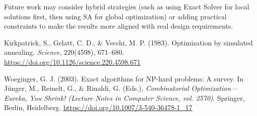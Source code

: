 \documentclass[conference]{IEEEtran}
\begin{document}
Future work may consider hybrid strategies (such as using Exact Solver for local solutions first, then using SA for global optimization) or adding practical constraints to make the results more aligned with real design requirements.

\FloatBarrier %

\begin{thebibliography}{99}
 Kirkpatrick, S., Gelatt, C. D., \& Vecchi, M. P. (1983). Optimization by simulated annealing. \textit{Science}, 220(4598), 671–680. \url{https://doi.org/10.1126/science.220.4598.671}

 Woeginger, G. J. (2003). Exact algorithms for NP-hard problems: A survey. In Jünger, M., Reinelt, G., \& Rinaldi, G. (Eds.), \textit{Combinatorial Optimization—Eureka, You Shrink! (Lecture Notes in Computer Science, vol. 2570)}. Springer, Berlin, Heidelberg. \url{https://doi.org/10.1007/3-540-36478-1_17}
\end{thebibliography}
\end{document}
